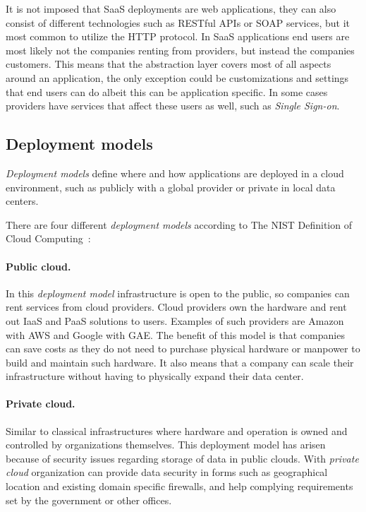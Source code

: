 It is not imposed that SaaS deployments are web applications, they can also consist of
different technologies such as RESTful APIs or SOAP services, but it most common to utilize the HTTP protocol.
In SaaS applications end users are most likely not the companies renting from providers, 
but instead the companies customers.
This means that the abstraction layer covers most of all aspects around an application,
the only exception could be customizations and settings that end users can do albeit 
this can be application specific. In some cases providers have services that affect
these users as well, such as \emph{Single Sign-on}.

\subsection{Deployment models}

\emph{Deployment models} define where and how applications are deployed in a cloud environment,
such as publicly with a global provider or private in local data centers.

There are four different \emph{deployment models} according to The 
NIST Definition of Cloud Computing~\cite{nist:mell11}:

\paragraph{Public cloud.}

In this \emph{deployment model} infrastructure is open to the public,
so companies can rent services from cloud providers.
Cloud providers own the hardware and rent out IaaS and PaaS solutions to users.
Examples of such providers are Amazon with AWS and Google with GAE.
The benefit of this model is that companies can save costs as 
they do not need to purchase physical hardware or manpower to build and maintain such hardware.
It also means that a company can scale their infrastructure without having to
physically expand their data center.

\paragraph{Private cloud.}

Similar to classical infrastructures where hardware and
operation is owned and controlled by organizations themselves.
This deployment model has arisen because of security issues regarding storage 
of data in public clouds. With \emph{private cloud} organization can provide 
data security in forms such as geographical location and existing domain specific firewalls,
and help complying requirements set by the government or other offices.

